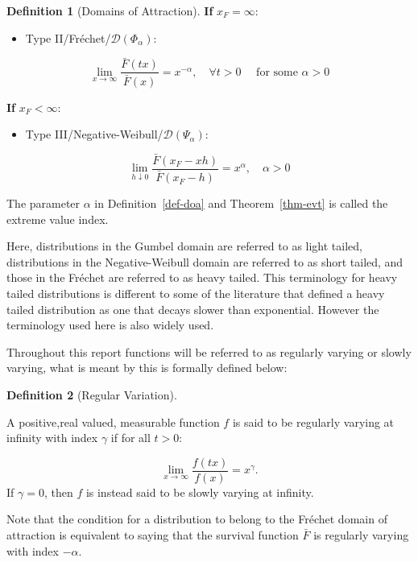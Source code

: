 \documentclass[
  10pt,
  a4paper,
]{scrreprt}
\providecommand{\tightlist}{%
  \setlength{\itemsep}{0pt}\setlength{\parskip}{0pt}}\usepackage{longtable,booktabs,array}
\theoremstyle{definition}
\newtheorem{definition}{Definition}[section]
\theoremstyle{plain}
\theoremstyle{plain}
\theoremstyle{remark}
\begin{document}
{\begin{definition}[Domains of
Attraction]
\textbf{If} \(x_F=\infty\):

\begin{itemize}
\tightlist
\item
  Type II/Fréchet/\(\mathcal D (\Phi_\alpha)\):
\end{itemize}

\[
\lim_{x\rightarrow\infty} \displaystyle\frac{\bar F(tx)}{\bar F(x)} = x^{-\alpha}, \quad \forall t>0 \quad \text{ for some } \alpha>0
\]

\textbf{If} \(x_F<\infty\):

\begin{itemize}
\tightlist
\item
  Type III/Negative-Weibull/\(\mathcal D(\Psi_\alpha)\):
\end{itemize}

\[
\lim_{h\downarrow 0}\displaystyle\frac{\bar F(x_F-xh)}{\bar F(x_F-h)} = x^\alpha, \quad\alpha>0
\]

\end{definition}

The parameter \(\alpha\) in Definition~\ref{def-doa} and
Theorem~\ref{thm-evt} is called the extreme value index.

Here, distributions in the Gumbel domain are referred to as light
tailed, distributions in the Negative-Weibull domain are referred to as
short tailed, and those in the Fréchet are referred to as heavy tailed.
This terminology for heavy tailed distributions is different to some of
the literature that defined a heavy tailed distribution as one that
decays slower than exponential. However the terminology used here is
also widely used.

Throughout this report functions will be referred to as regularly
varying or slowly varying, what is meant by this is formally defined
below:

\begin{definition}[Regular
Variation]\protect\hypertarget{def-rv}{}\label{def-rv}

A positive,real valued, measurable function \(f\) is said to be
regularly varying at infinity with index \(\gamma\) if for all \(t>0\):

\[
\lim_{x\rightarrow\infty}\displaystyle\frac{f(tx)}{f(x)} = x^{\gamma}.
\] If \(\gamma =0\), then \(f\) is instead said to be slowly varying at
infinity.

\end{definition}

Note that the condition for a distribution to belong to the Fréchet
domain of attraction is equivalent to saying that the survival function
\(\bar F\) is regularly varying with index \(-\alpha\).

}
\end{document}
